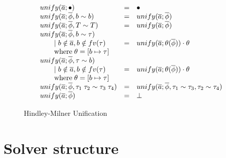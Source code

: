 \begin{figure}
\[
\begin{array}{l c l}
unify(\overline{a}; \bullet) &=& \bullet
\\
unify(\overline{a}; \overline{\phi}, b \sim b) &=& unify(\overline{a};
\overline{\phi})
\\
unify(\overline{a}; \overline{\phi}, T \sim T) &=& unify(\overline{a};
\overline{\phi})
\\
unify(\overline{a}; \overline{\phi}, b \sim \tau)
\\ \qquad \mid b \notin \overline{a}, b \notin fv(\tau) &=& unify(\overline{a};
\theta(\overline{\phi})) \cdot \theta
\\ \qquad \text{where} \; \theta = [b \mapsto \tau]
\\
unify(\overline{a}; \overline{\phi}, \tau \sim b)
\\ \qquad \mid b \notin \overline{a}, b \notin fv(\tau) &=& unify(\overline{a};
\theta(\overline{\phi})) \cdot \theta
\\ \qquad \text{where} \; \theta = [b \mapsto \tau]
\\
unify(\overline{a}; \overline{\phi}, \tau_1 \; \tau_2 \sim \tau_3 \; \tau_4) &=&
unify(\overline{a}; \overline{\phi}, \tau_1 \sim \tau_3, \tau_2 \sim \tau_4)
\\
unify(\overline{a}; \overline{\phi}) &=& \bot
\end{array}
\]
\caption{Hindley-Milner Unification}
\label{fig:unify}
\end{figure}

\section{Solver structure}
